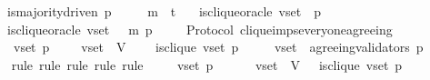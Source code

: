 \begin{isabellebody}
\ \ {\isasymlongrightarrow}\ is{\isacharunderscore}majority{\isacharunderscore}driven\ p\isanewline
\ \ {\isasymlongrightarrow}\ {\isasymsigma}\ {\isasymunion}\ {\isacharbraceleft}m{\isacharprime}{\isacharbraceright}\ {\isasymin}\ {\isasymSigma}t\isanewline
\ \ {\isasymlongrightarrow}\ is{\isacharunderscore}clique{\isacharunderscore}oracle\ {\isacharparenleft}v{\isacharunderscore}set{\isacharcomma}\ {\isasymsigma}{\isacharcomma}\ p{\isacharparenright}\ \isanewline
\ \ {\isasymlongrightarrow}\ is{\isacharunderscore}clique{\isacharunderscore}oracle\ {\isacharparenleft}v{\isacharunderscore}set{\isacharcomma}\ {\isasymsigma}\ {\isasymunion}\ {\isacharbraceleft}m{\isacharprime}{\isacharbraceright}{\isacharcomma}\ p{\isacharparenright}{\isachardoublequoteclose}\isanewline
%
\isadelimproof
\ \ %
\endisadelimproof
%
\isatagproof
{}\isamarkupfalse%
%
\endisatagproof
{\isafoldproof}%
%
\isadelimproof
\isanewline
%
\endisadelimproof
\isanewline
\isanewline
\isanewline
\isanewline
{}\isamarkupfalse%
\ {\isacharparenleft}\ Protocol{\isacharparenright}\ clique{\isacharunderscore}imps{\isacharunderscore}everyone{\isacharunderscore}agreeing\ {\isacharcolon}\isanewline
\ \ {\isachardoublequoteopen}{\isasymforall}\ {\isasymsigma}\ v{\isacharunderscore}set\ p{\isachardot}\ {\isasymsigma}\ {\isasymin}\ {\isasymSigma}\ {\isasymand}\ v{\isacharunderscore}set\ {\isasymsubseteq}\ V\ \isanewline
\ \ {\isasymlongrightarrow}\ is{\isacharunderscore}clique\ {\isacharparenleft}v{\isacharunderscore}set{\isacharcomma}\ p{\isacharcomma}\ {\isasymsigma}{\isacharparenright}\ \isanewline
\ \ {\isasymlongrightarrow}\ v{\isacharunderscore}set\ {\isasymsubseteq}\ agreeing{\isacharunderscore}validators\ {\isacharparenleft}p{\isacharcomma}\ {\isasymsigma}{\isacharparenright}{\isachardoublequoteclose}\isanewline
%
\isadelimproof
\ \ %
\endisadelimproof
%
\isatagproof
{}\isamarkupfalse%
\ {\isacharparenleft}rule{\isacharcomma}\ rule{\isacharcomma}\ rule{\isacharcomma}\ rule{\isacharcomma}\ rule{\isacharparenright}\isanewline
{}\isamarkupfalse%
{\isacharminus}\isanewline
\ \ \isamarkupfalse%
\ {\isasymsigma}\ v{\isacharunderscore}set\ p\ \isamarkupfalse%
\ {\isachardoublequoteopen}{\isasymsigma}\ {\isasymin}\ {\isasymSigma}\ {\isasymand}\ v{\isacharunderscore}set\ {\isasymsubseteq}\ V{\isachardoublequoteclose}\ \ \ {\isachardoublequoteopen}is{\isacharunderscore}clique\ {\isacharparenleft}v{\isacharunderscore}set{\isacharcomma}\ p{\isacharcomma}\ {\isasymsigma}{\isacharparenright}{\isachardoublequoteclose}\ \isanewline

\end{isabellebody}

